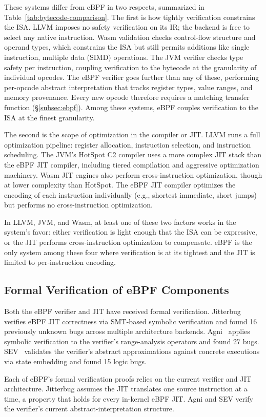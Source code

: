 These systems differ from eBPF in two respects, summarized in Table~\ref{tab:bytecode-comparison}. The first is how tightly verification constrains the ISA. LLVM imposes no safety verification on its IR; the backend is free to select any native instruction. Wasm validation checks control-flow structure and operand types, which constrains the ISA but still permits additions like single instruction, multiple data (SIMD) operations. The JVM verifier checks type safety per instruction, coupling verification to the bytecode at the granularity of individual opcodes. The eBPF verifier goes further than any of these, performing per-opcode abstract interpretation that tracks register types, value ranges, and memory provenance. Every new opcode therefore requires a matching transfer function (\S\ref{subsec:ebpf}). Among these systems, eBPF couples verification to the ISA at the finest granularity.



The second is the scope of optimization in the compiler or JIT. LLVM runs a full optimization pipeline: register allocation, instruction selection, and instruction scheduling. The JVM's HotSpot C2 compiler uses a more complex JIT stack than the eBPF JIT compiler, including tiered compilation and aggressive optimization machinery. Wasm JIT engines also perform cross-instruction optimization, though at lower complexity than HotSpot. The eBPF JIT compiler optimizes the encoding of each instruction individually (e.g., shortest immediate, short jumps) but performs no cross-instruction optimization.

In LLVM, JVM, and Wasm, at least one of these two factors works in the system's favor: either verification is light enough that the ISA can be expressive, or the JIT performs cross-instruction optimization to compensate. eBPF is the only system among these four where verification is at its tightest and the JIT is limited to per-instruction encoding.

\subsection{Formal Verification of eBPF Components}
\label{subsec:formal}

Both the eBPF verifier and JIT have received formal verification. Jitterbug~\cite{nelson2020specification} verifies eBPF JIT correctness via SMT-based symbolic verification and found 16 previously unknown bugs across multiple architecture backends. Agni~\cite{vishwanathan2023verifying} applies symbolic verification to the verifier's range-analysis operators and found 27 bugs. 
SEV~\cite{sun2024validating} validates the verifier's abstract approximations against concrete executions via state embedding and found 15 logic bugs.

Each of eBPF's formal verification proofs relies on the current verifier and JIT architecture. Jitterbug assumes the JIT translates one source instruction at a time, a property that holds for every in-kernel eBPF JIT. Agni and SEV verify the verifier's current abstract-interpretation structure.